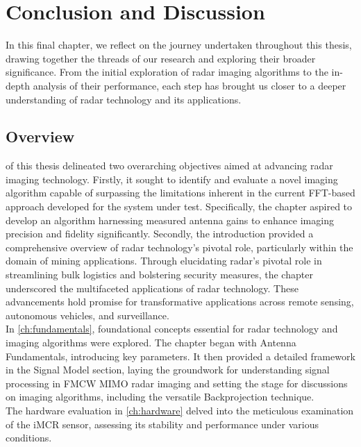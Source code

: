 \chapter{Conclusion and Discussion}
\label{ch:conclusion}
In this final chapter, we reflect on the journey undertaken throughout this thesis,
drawing together the threads of our research and exploring their broader significance.
From the initial exploration of radar imaging algorithms to the in-depth analysis of their performance,
each step has brought us closer to a deeper understanding of radar technology and its applications.

\section{Overview}
 of this thesis delineated two overarching objectives
aimed at advancing radar imaging technology. Firstly, it sought to identify
and evaluate a novel imaging algorithm capable of surpassing the limitations inherent
in the current FFT-based approach developed for the system under test. Specifically,
the chapter aspired to develop an algorithm harnessing measured antenna gains to
enhance imaging precision and fidelity significantly.
Secondly, the introduction provided a comprehensive overview of radar technology's pivotal role,
particularly within the domain of mining applications. Through elucidating radar's pivotal role
in streamlining bulk logistics and bolstering security measures,
the chapter underscored the multifaceted applications of radar technology.
These advancements hold promise for transformative applications across remote sensing,
autonomous vehicles, and surveillance.
\\
In \cref{ch:fundamentals}, foundational concepts essential for
radar technology and imaging algorithms were explored.
The chapter began with Antenna Fundamentals, introducing key parameters.
It then provided a detailed framework in the Signal Model section,
laying the groundwork for understanding signal processing in FMCW MIMO radar imaging
and setting the stage for discussions on imaging algorithms, including the versatile Backprojection technique.
\\
The hardware evaluation in \cref{ch:hardware} delved into the meticulous examination
of the iMCR sensor, assessing its stability and performance under various conditions.
